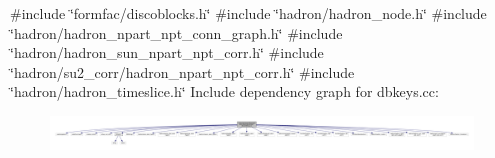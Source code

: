 {\ttfamily \#include \char`\"{}formfac/discoblocks.\+h\char`\"{}}\newline
{\ttfamily \#include \char`\"{}hadron/hadron\+\_\+node.\+h\char`\"{}}\newline
{\ttfamily \#include \char`\"{}hadron/hadron\+\_\+npart\+\_\+npt\+\_\+conn\+\_\+graph.\+h\char`\"{}}\newline
{\ttfamily \#include \char`\"{}hadron/hadron\+\_\+sun\+\_\+npart\+\_\+npt\+\_\+corr.\+h\char`\"{}}\newline
{\ttfamily \#include \char`\"{}hadron/su2\+\_\+corr/hadron\+\_\+npart\+\_\+npt\+\_\+corr.\+h\char`\"{}}\newline
{\ttfamily \#include \char`\"{}hadron/hadron\+\_\+timeslice.\+h\char`\"{}}\newline
Include dependency graph for dbkeys.\+cc\+:
\nopagebreak
\begin{figure}[H]
\begin{center}
\leavevmode
\includegraphics[width=350pt]{db/d17/adat-devel_2main_2dbutil_2dbkeys_8cc__incl}
\end{center}
\end{figure}
